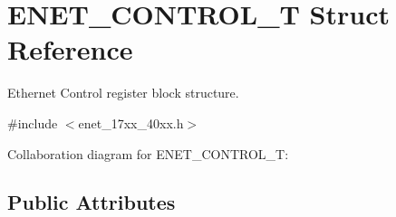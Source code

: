 \hypertarget{structENET__CONTROL__T}{}\section{E\+N\+E\+T\+\_\+\+C\+O\+N\+T\+R\+O\+L\+\_\+T Struct Reference}
\label{structENET__CONTROL__T}


Ethernet Control register block structure.  




{\ttfamily \#include $<$enet\+\_\+17xx\+\_\+40xx.\+h$>$}



Collaboration diagram for E\+N\+E\+T\+\_\+\+C\+O\+N\+T\+R\+O\+L\+\_\+T\+:
\subsection*{Public Attributes}
